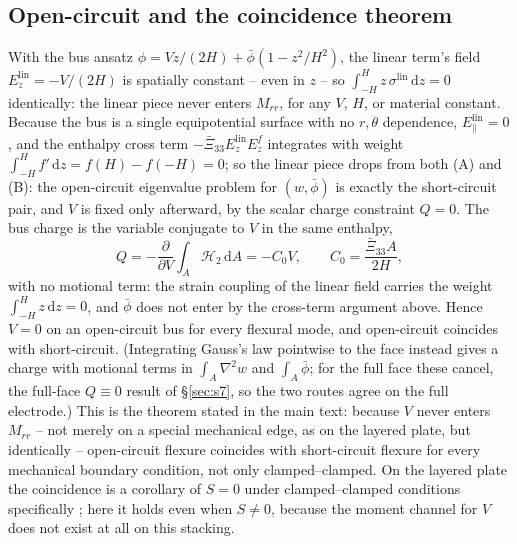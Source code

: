 \documentclass[11pt]{article}
\newcommand{\Xibar}{\bar{\Xi}_{33}}
\begin{document}
\subsection{Open-circuit and the coincidence theorem}
With the bus ansatz $\phi=Vz/(2H)+\bar\phi(1-z^2/H^2)$, the linear
term's field $E_z^{\mathrm{lin}}=-V/(2H)$ is spatially constant --
even in $z$ -- so
$\int_{-H}^{H}z\,\sigma^{\mathrm{lin}}\,\mathrm dz=0$ identically: the
linear piece never enters $M_{rr}$, for any $V$, $H$, or material
constant. Because the bus is a single equipotential surface with no
$r,\theta$ dependence, $E_\parallel^{\mathrm{lin}}=0$, and the enthalpy
cross term $-\Xibar E_z^{\mathrm{lin}}E_z^{f}$ integrates with weight
$\int_{-H}^{H}f'\,\mathrm dz=f(H)-f(-H)=0$; so the linear piece drops from
both (A) and (B): the open-circuit eigenvalue problem for
$(w,\bar\phi)$ is exactly the short-circuit pair, and $V$ is fixed only
afterward, by the scalar charge constraint $Q=0$. The bus charge is the
variable conjugate to $V$ in the same enthalpy,
\begin{equation}
Q=-\frac{\partial}{\partial V}\int_A\mathcal H_2\,\mathrm dA
=-C_0V,\qquad C_0=\frac{\Xibar A}{2H}, \label{eq:Qfull}
\end{equation}
with no motional term: the strain coupling of the linear field carries
the weight $\int_{-H}^{H}z\,\mathrm dz=0$, and $\bar\phi$ does not enter
by the cross-term argument above. Hence $V=0$ on an open-circuit bus for
every flexural mode, and open-circuit coincides with short-circuit.
(Integrating Gauss's law pointwise to the face instead gives a charge
with motional terms in $\int_A\nabla^2w$ and $\int_A\bar\phi$; for the
full face these cancel, the full-face $Q\equiv0$ result of \S\ref{sec:s7},
so the two routes agree on the full electrode.) This is the theorem stated
in the main text: because $V$ never enters $M_{rr}$ -- not merely on a
special mechanical edge, as on the layered plate, but identically --
open-circuit flexure coincides with short-circuit flexure for every
mechanical boundary condition, not only clamped--clamped. On the
layered plate the coincidence is a corollary of $S=0$ under
clamped--clamped conditions specifically \cite{mccune2026piezo}; here it
holds even when $S\ne0$, because the moment channel for $V$ does not
exist at all on this stacking.
\end{document}
